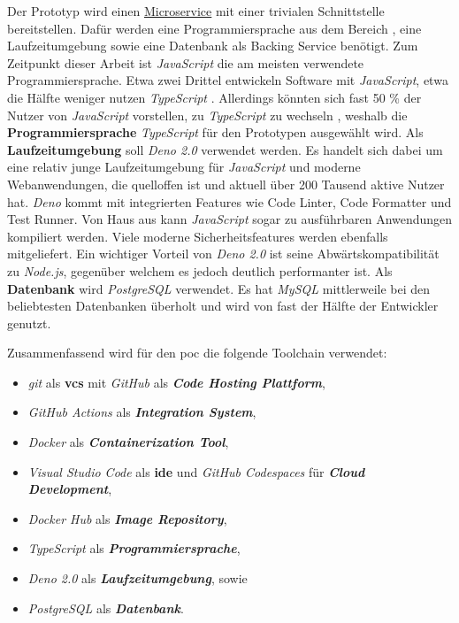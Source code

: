 Der Prototyp wird einen \hyperref[sec:02-02_microservices]{Microservice} mit einer trivialen Schnittstelle bereitstellen. Dafür werden eine Programmiersprache aus dem Bereich , eine Laufzeitumgebung sowie eine Datenbank als Backing Service benötigt. Zum Zeitpunkt dieser Arbeit ist \textit{JavaScript} die am meisten verwendete Programmiersprache. Etwa zwei Drittel entwickeln Software mit \textit{JavaScript}, etwa die Hälfte weniger nutzen \textit{TypeScript} \cite{206:Developer-Survey-2024,207:Developer-Ecosystem}. Allerdings könnten sich fast 50 \% der Nutzer von \textit{JavaScript} vorstellen, zu \textit{TypeScript} zu wechseln \cite{206:Developer-Survey-2024}, weshalb die \textbf{Programmiersprache} \textit{TypeScript} für den Prototypen ausgewählt wird. Als \textbf{Laufzeitumgebung} soll \textit{Deno 2.0} verwendet werden. Es handelt sich dabei um eine relativ junge Laufzeitumgebung für \textit{JavaScript} und moderne Webanwendungen, die quelloffen ist und aktuell über 200 Tausend aktive Nutzer hat. \textit{Deno} kommt mit integrierten Features wie Code Linter, Code Formatter und Test Runner. Von Haus aus kann \textit{JavaScript} sogar zu ausführbaren Anwendungen kompiliert werden. Viele moderne Sicherheitsfeatures werden ebenfalls mitgeliefert. Ein wichtiger Vorteil von \textit{Deno 2.0} ist seine Abwärtskompatibilität zu \textit{Node.js}, gegenüber welchem es jedoch deutlich performanter ist. \cite{309:Deno} Als \textbf{Datenbank} wird \textit{PostgreSQL} verwendet. Es hat \textit{MySQL} mittlerweile bei den beliebtesten Datenbanken überholt und wird von fast der Hälfte der Entwickler genutzt. \cite{206:Developer-Survey-2024}

Zusammenfassend wird für den \Gls{poc} die folgende Toolchain verwendet:

\begin{itemize}
    \item \textit{\Gls{git}} als \textbf{\Gls{vcs}} mit \textit{GitHub} als \textbf{\textit{Code Hosting Plattform}},
    \item \textit{GitHub Actions} als \textbf{\textit{Integration System}},
    \item \textit{Docker} als \textbf{\textit{Containerization Tool}},
    \item \textit{Visual Studio Code} als \textbf{\Gls{ide}} und \textit{GitHub Codespaces} für \textbf{\textit{Cloud Development}},
    \item \textit{Docker Hub} als \textbf{\textit{Image Repository}},
    \item \textit{TypeScript} als \textbf{\textit{Programmiersprache}},
    \item \textit{Deno 2.0} als \textbf{\textit{Laufzeitumgebung}}, sowie
    \item \textit{PostgreSQL} als \textbf{\textit{Datenbank}}.
\end{itemize}
